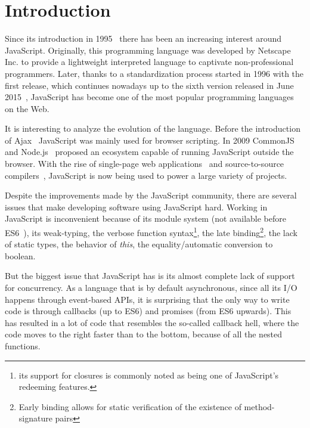 \documentclass{sig-alternate}
\begin{document}



\section{Introduction}

Since its introduction in 1995~\cite{web:js} there has been an increasing interest around JavaScript. Originally, this programming language was developed by Netscape Inc. to provide a lightweight interpreted language to captivate non-professional programmers. Later, thanks to a standardization process started in 1996 with the first release, which continues nowadays up to the sixth version released in June 2015~\cite{web:ecmascript6}, JavaScript has become one of the most popular programming languages on the Web.

It is interesting to analyze the evolution of the language. Before the introduction of Ajax~\cite{web:ajax} JavaScript was mainly used for browser scripting. In 2009 CommonJS~\cite{web:commonjs} and Node.js~\cite{web:nodejs} proposed an ecosystem capable of running JavaScript outside the browser. With the rise of single-page web applications~\cite{web:spa} and source-to-source compilers~\cite{web:compile2js}, JavaScript is now being used to power a large variety of projects. 

Despite the improvements made by the JavaScript community, there are several issues that make developing software using JavaScript hard. Working in JavaScript is inconvenient because of its module system (not available before ES6~\cite{web:es6modules}), its weak-typing, the verbose function syntax\footnote{its support for closures is commonly noted as being one of JavaScript\rq{s} redeeming features.}, the late binding\footnote{Early binding allows for static verification of the existence of method-signature pairs}, the lack of static types, the behavior of \emph{this}, the equality/automatic conversion to boolean.

But the biggest issue that JavaScript has is its almost complete lack of support for concurrency. As a language that is by default asynchronous, since all its I/O happens through event-based APIs, it is surprising that the only way to write code is through callbacks (up to ES6) and promises (from ES6 upwards). This has resulted in a lot of code that resembles the so-called callback hell, where the code moves to the right faster than to the bottom, because of all the nested functions.
\end{document}

